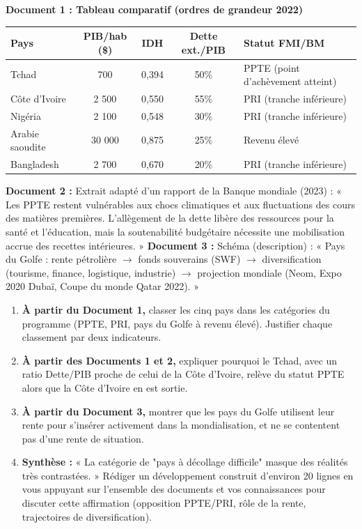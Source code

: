 \documentclass[11pt]{article}
\newcounter{popsec}
\newcounter{popsub}
\newcommand{\courssub}[1]{%
  \stepcounter{popsub}%
  \par\vspace{9pt}\noindent{\popxbold\fontsize{11.5}{13}\selectfont\color{popink}{\color{poporange}\thepopsec.\thepopsub}\hspace{6pt}#1}\par\nopagebreak\vspace{4pt}
}
\begin{document}
\courssub{Je me prépare au Bac}

\begin{exercice}
\textbf{Document 1 : Tableau comparatif (ordres de grandeur 2022)}
\begin{center}
\begin{tabular}{|l|c|c|c|l|}\hline
\textbf{Pays} & \textbf{PIB/hab (\$)} & \textbf{IDH} & \textbf{Dette ext./PIB} & \textbf{Statut FMI/BM} \\ \hline
Tchad & 700 & 0,394 & 50\% & PPTE (point d'achèvement atteint) \\
Côte d'Ivoire & 2 500 & 0,550 & 55\% & PRI (tranche inférieure) \\
Nigéria & 2 100 & 0,548 & 30\% & PRI (tranche inférieure) \\
Arabie saoudite & 30 000 & 0,875 & 25\% & Revenu élevé \\
Bangladesh & 2 700 & 0,670 & 20\% & PRI (tranche inférieure) \\ \hline
\end{tabular}
\end{center}
\textbf{Document 2 :} Extrait adapté d'un rapport de la Banque mondiale (2023) : « Les PPTE restent vulnérables aux chocs climatiques et aux fluctuations des cours des matières premières. L'allègement de la dette libère des ressources pour la santé et l'éducation, mais la soutenabilité budgétaire nécessite une mobilisation accrue des recettes intérieures. »
\textbf{Document 3 :} Schéma (description) : « Pays du Golfe : rente pétrolière $\rightarrow$ fonds souverains (SWF) $\rightarrow$ diversification (tourisme, finance, logistique, industrie) $\rightarrow$ projection mondiale (Neom, Expo 2020 Dubaï, Coupe du monde Qatar 2022). »

\begin{enumerate}
\item \textbf{À partir du Document 1,} classer les cinq pays dans les catégories du programme (PPTE, PRI, pays du Golfe à revenu élevé). Justifier chaque classement par deux indicateurs.
\item \textbf{À partir des Documents 1 et 2,} expliquer pourquoi le Tchad, avec un ratio Dette/PIB proche de celui de la Côte d'Ivoire, relève du statut PPTE alors que la Côte d'Ivoire en est sortie.
\item \textbf{À partir du Document 3,} montrer que les pays du Golfe utilisent leur rente pour s'insérer activement dans la mondialisation, et ne se contentent pas d'une rente de situation.
\item \textbf{Synthèse :} « La catégorie de "pays à décollage difficile" masque des réalités très contrastées. » Rédiger un développement construit d'environ 20 lignes en vous appuyant sur l'ensemble des documents et vos connaissances pour discuter cette affirmation (opposition PPTE/PRI, rôle de la rente, trajectoires de diversification).
\end{enumerate}
\end{exercice}
\end{document}

